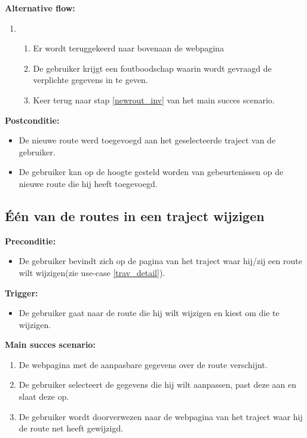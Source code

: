 \documentclass[11pt,twoside,a4paper]{article}
\newcommand{\subpunt}[1]{
	\noindent
	\textbf{\small{#1}}
}
\newenvironment{precond}{
	\subpunt{Preconditie:}
	\begin{itemize}[label={}]
}{
	\end{itemize}
}
\newenvironment{trigger}{
	\subpunt{Trigger:}
	\begin{itemize}[label={}]
}{
	\end{itemize}
}
\newenvironment{mainss}{
	\subpunt{Main succes scenario:}
	\begin{enumerate}
}{
	\end{enumerate}
}
\newenvironment{altern}{
	\subpunt{Alternative flow:}
	\begin{enumerate}
}{
	\end{enumerate}
}
\newenvironment{postcond}{
	\subpunt{Postconditie:}
	\begin{itemize}[label={}]
}{
	\end{itemize}
}
\newcommand{\flowidx}{0}
\newcounter{nstap}
\newcommand{\flowtitle}[1]{					%
	\setcounter{nstap}{0}
	\item[\flowidx.][\emph{#1}]
}
\newcommand{\flowstap}{ 					%
	\stepcounter{nstap}
	\item[\flowidx.\arabic{nstap}]
}
\newenvironment{flow}[2]{					
	\renewcommand{\flowidx}{#1}
	
	\flowtitle{#2}
	\begin{enumerate}
}{
	\end{enumerate}
}
\begin{document}
	\begin{altern}
			\begin{flow}{\ref{newrout_end}}{Niet alle verplichte gegevens werden ingegeven.}
				\flowstap Er wordt teruggekeerd naar bovenaan de webpagina
				\flowstap De gebruiker krijgt een foutboodschap waarin wordt gevraagd de verplichte gegevens in te geven.
				\flowstap Keer terug naar stap \ref{newrout_inv} van het main succes scenario.
			\end{flow}
	\end{altern}
	
	\begin{postcond}
		\item De nieuwe route werd toegevoegd aan het geselecteerde traject van de gebruiker.
		\item De gebruiker kan op de hoogte gesteld worden van gebeurtenissen op de nieuwe route die hij heeft toegevoegd.
	\end{postcond}
	
	
	
	\subsection{\'E\'en van de routes in een traject wijzigen}
	
	\begin{precond}
		\item De gebruiker bevindt zich op de pagina van het traject waar hij/zij een route wilt wijzigen(zie use-case \ref{trav_detail}).
	\end{precond}
	
	\begin{trigger}
		\item De gebruiker gaat naar de route die hij wilt wijzigen en kiest om die te wijzigen.
	\end{trigger}
	
	\begin{mainss}
		\item De webpagina met de aanpasbare gegevens over de route verschijnt.
		\item De gebruiker selecteert de gegevens die hij wilt aanpassen, past deze aan en slaat deze op.\label{chge_rout_save}
		\item De gebruiker wordt doorverwezen naar de webpagina van het traject waar hij de route net heeft gewijzigd.\label{chge_rout_end}
	\end{mainss}
	
\end{document}
